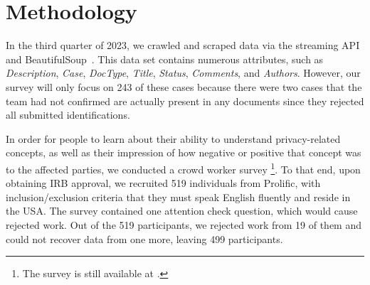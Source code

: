 \section{Methodology
}


In the third quarter of 2023, we crawled and scraped data via the \tosdr{} streaming API and BeautifulSoup~\cite{beautifulSoup}.
This data set contains numerous attributes, such as \textit{Description}, \textit{Case}, \textit{DocType}, \textit{Title}, \textit{Status}, \textit{Comments}, and \textit{Authors}.
However, our survey will only focus on 243 of these cases because there were two cases that the \tosdr{} team had not confirmed are actually present in any documents since they rejected all submitted identifications.

In order for people to learn about their ability to understand privacy-related concepts, as well as their impression of how negative or positive that concept was to the affected parties, we conducted a crowd worker survey%
\footnote{The survey is still available at .}.
To that end, upon obtaining IRB approval, we recruited 519 individuals from Prolific, with inclusion/exclusion criteria that they must speak English fluently and reside in the USA.
The survey contained one attention check question, which would cause rejected work.
Out of the 519 participants, we rejected work from 19 of them and could not recover data from one more, leaving 499 participants.



